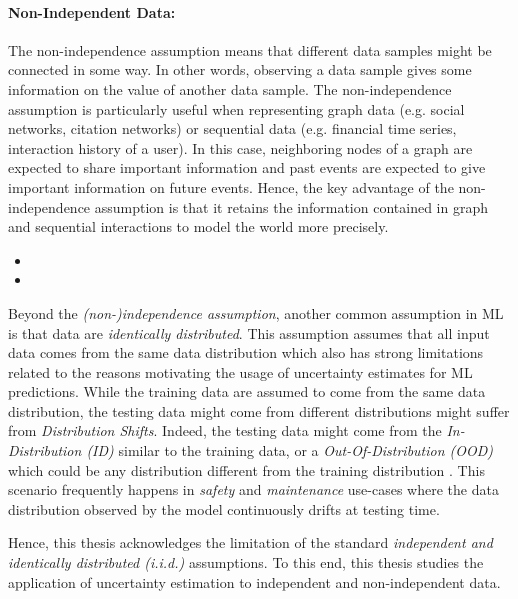 \paragraph*{Non-Independent Data:} The non-independence assumption means that different data samples might be connected in some way. In other words, observing a data sample gives some information on the value of another data sample.
The non-independence assumption is particularly useful when representing graph data (e.g. social networks, citation networks) or sequential data (e.g. financial time series, interaction history of a user).
In this case, neighboring nodes of a graph are expected to share important information and past events are expected to give important information on future events.
Hence, the key advantage of the non-independence assumption is that it retains the information contained in graph and sequential interactions to model the world more precisely.

\begin{itemize}
    \item {}
    \item {}
\end{itemize}

Beyond the \emph{(non-)independence assumption}, another common assumption in ML is that data are \emph{identically distributed}. 
This assumption assumes that all input data comes from the same data distribution which also has strong limitations related to the reasons motivating the usage of uncertainty estimates for ML predictions.
While the training data are assumed to come from the same data distribution, the testing data might come from different distributions might suffer from \emph{Distribution Shifts}. 
Indeed, the testing data might come from the \emph{In-Distribution (ID)} similar to the training data, or a \emph{Out-Of-Distribution (OOD)} which could be any distribution different from the training distribution .
This scenario frequently happens in \emph{safety} and \emph{maintenance} use-cases where the data distribution observed by the model continuously drifts at testing time. 

Hence, this thesis acknowledges the limitation of the standard \emph{independent and identically distributed (i.i.d.)} assumptions.
To this end, this thesis studies the application of uncertainty estimation to independent and non-independent data.

